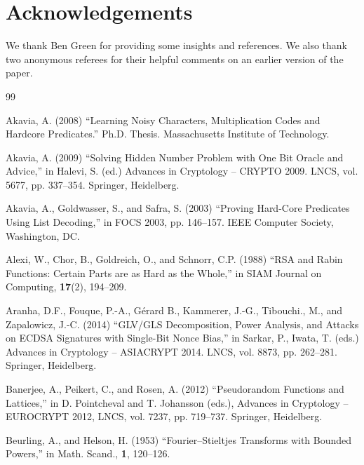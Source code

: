 \documentclass[11pt]{article}
\theoremstyle{definition}
\begin{document}
\section*{Acknowledgements}

We thank Ben Green for providing some insights and references.
We also thank two anonymous referees for their helpful comments on an earlier version of the paper.


%


\begin{thebibliography}{99}

    {Akavia, A. (2008)
        ``Learning Noisy Characters, Multiplication Codes and Hardcore Predicates.'' Ph.D. Thesis. Massachusetts Institute of Technology.}

    {Akavia, A. (2009)
        ``Solving Hidden Number Problem with One Bit Oracle and Advice,'' in Halevi, S. (ed.) Advances in Cryptology -- CRYPTO 2009. LNCS, vol. 5677, pp. 337--354. Springer, Heidelberg.}

    {Akavia, A., Goldwasser, S., and Safra, S. (2003)
        ``Proving Hard-Core Predicates Using List Decoding,'' in FOCS 2003, pp. 146--157. IEEE Computer Society, Washington, DC.}

    {Alexi, W., Chor, B., Goldreich, O., and Schnorr, C.P. (1988)
        ``RSA and Rabin Functions: Certain Parts are as Hard as the Whole,'' in SIAM Journal on Computing, \textbf{17}(2), 194--209.}

    {Aranha, D.F., Fouque, P.-A., G{\'e}rard B., Kammerer, J.-G., Tibouchi., M., and Zapalowicz, J.-C. (2014)
        ``GLV/GLS Decomposition, Power Analysis, and Attacks on ECDSA Signatures with Single-Bit Nonce Bias,'' in Sarkar, P., Iwata, T. (eds.) Advances in Cryptology -- ASIACRYPT 2014. LNCS, vol. 8873, pp. 262--281. Springer, Heidelberg.}

    {Banerjee, A., Peikert, C., and Rosen, A. (2012)
        ``Pseudorandom Functions and Lattices,'' in D. Pointcheval and T. Johansson (eds.), Advances in Cryptology -- EUROCRYPT 2012, LNCS, vol. 7237, pp. 719--737. Springer, Heidelberg.}

    {Beurling, A., and Helson, H. (1953)
        ``Fourier--Stieltjes Transforms with Bounded Powers,'' in Math. Scand., \textbf{1}, 120--126.}


\end{thebibliography}
\end{document}
